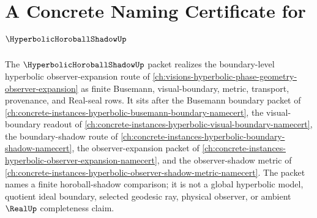 \chapter{A Concrete Naming Certificate for $\HyperbolicHoroballShadowUp$}
\label{ch:concrete-instances-hyperbolic-horoball-shadow-namecert}

The $\HyperbolicHoroballShadowUp$ packet realizes the boundary-level hyperbolic observer-expansion route of \autoref{ch:visions-hyperbolic-phase-geometry-observer-expansion} as finite Busemann, visual-boundary, metric, transport, provenance, and Real-seal rows. It sits after the Busemann boundary packet of \autoref{ch:concrete-instances-hyperbolic-busemann-boundary-namecert}, the visual-boundary readout of \autoref{ch:concrete-instances-hyperbolic-visual-boundary-namecert}, the boundary-shadow route of \autoref{ch:concrete-instances-hyperbolic-boundary-shadow-namecert}, the observer-expansion packet of \autoref{ch:concrete-instances-hyperbolic-observer-expansion-namecert}, and the observer-shadow metric of \autoref{ch:concrete-instances-hyperbolic-observer-shadow-metric-namecert}. The packet names a finite horoball-shadow comparison; it is not a global hyperbolic model, quotient ideal boundary, selected geodesic ray, physical observer, or ambient $\RealUp$ completeness claim.

